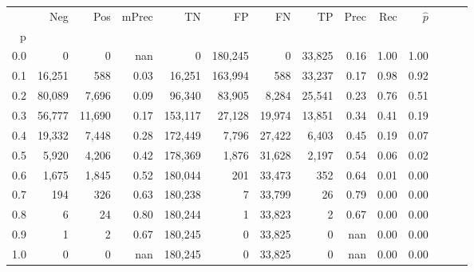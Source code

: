 \begin{tabular}{rrrrrrrrrrrrrr}
\toprule
{} &     Neg &     Pos & mPrec &       TN &       FP &      FN &      TP &  Prec &   Rec & $\hat{p}$ \\
p   &         &         &       &          &          &         &         &       &       &           \\
\midrule
0.0 &       0 &       0 &   nan &        0 &  180,245 &       0 &  33,825 &  0.16 &  1.00 &      1.00 \\
0.1 &  16,251 &     588 &  0.03 &   16,251 &  163,994 &     588 &  33,237 &  0.17 &  0.98 &      0.92 \\
0.2 &  80,089 &   7,696 &  0.09 &   96,340 &   83,905 &   8,284 &  25,541 &  0.23 &  0.76 &      0.51 \\
0.3 &  56,777 &  11,690 &  0.17 &  153,117 &   27,128 &  19,974 &  13,851 &  0.34 &  0.41 &      0.19 \\
0.4 &  19,332 &   7,448 &  0.28 &  172,449 &    7,796 &  27,422 &   6,403 &  0.45 &  0.19 &      0.07 \\
0.5 &   5,920 &   4,206 &  0.42 &  178,369 &    1,876 &  31,628 &   2,197 &  0.54 &  0.06 &      0.02 \\
0.6 &   1,675 &   1,845 &  0.52 &  180,044 &      201 &  33,473 &     352 &  0.64 &  0.01 &      0.00 \\
0.7 &     194 &     326 &  0.63 &  180,238 &        7 &  33,799 &      26 &  0.79 &  0.00 &      0.00 \\
0.8 &       6 &      24 &  0.80 &  180,244 &        1 &  33,823 &       2 &  0.67 &  0.00 &      0.00 \\
0.9 &       1 &       2 &  0.67 &  180,245 &        0 &  33,825 &       0 &   nan &  0.00 &      0.00 \\
1.0 &       0 &       0 &   nan &  180,245 &        0 &  33,825 &       0 &   nan &  0.00 &      0.00 \\
\bottomrule
\end{tabular}
